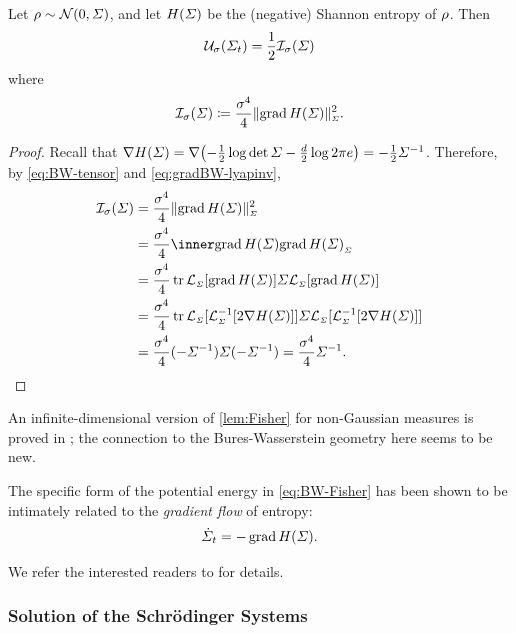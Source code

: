 \begin{lemma}\label{lem:Fisher}
Let $\rho \sim \mathcal{N}(0,\Sigma)$, and let $\entropy$ be the (negative) Shannon entropy of $\rho$. Then 
\begin{equation}
\label{eq:BW-U-Fisher}
\penergyBW = \frac{1}{2}\fisherBW %
\end{equation}where 
\begin{equation}
\label{eq:BW-Fisher}
\fisherBW \defeq \frac{\sdev^4}{4} \normBWsq[\gradBW \entropy][\covbase].
\end{equation}
\end{lemma}
\begin{proof}
Recall that $\nabla \entropy= \nabla\parens*{ -\frac{1}{2} \log\det \covbase - \frac{\vdim}{2} \log 2\pi e }= -\frac{1}{2}  \covbase^{-1}$. Therefore, by \eqref{eq:BW-tensor} and \eqref{eq:gradBW-lyapinv},
\begin{align*}
\fisherBW &= \frac{\sdev^4}{4} \normBWsq[\gradBW \entropy][\covbase] \\
&= \frac{\sdev^4}{4}\innerBW[\gradBW \entropy][\gradBW \entropy][\covbase] \\
&= \frac{\sdev^4}{4} \tr \lyap[\covbase][\gradBW \entropy]\covbase\lyap[\covbase][\gradBW \entropy] \\
&= \frac{\sdev^4}{4} \tr \lyap[\covbase][\lyapinv[\covbase][2\nabla \entropy]]\covbase\lyap[\covbase][\lyapinv[\covbase][2\nabla \entropy]] \\
&= \frac{\sdev^4}{4} (-\covbase^{-1})\covbase(-\covbase^{-1})=\frac{\sdev^4}{4}\covbase^{-1}.
\end{align*}
\end{proof}

An infinite-dimensional version of \cref{lem:Fisher} for non-Gaussian measures is proved in \citet{chen2016relation, gentil2017analogy}; the connection to the Bures-Wasserstein geometry here seems to be new.

The specific form of the potential energy in \eqref{eq:BW-Fisher} has been shown to be intimately related to the \emph{gradient flow} of entropy:
\begin{align}
\dSigcurve = - \gradBW \entropy.
\end{align}

We refer the interested readers to \citep{gentil2020dynamical} for details.


\subsubsection{Solution of the Schr\"odinger Systems}


